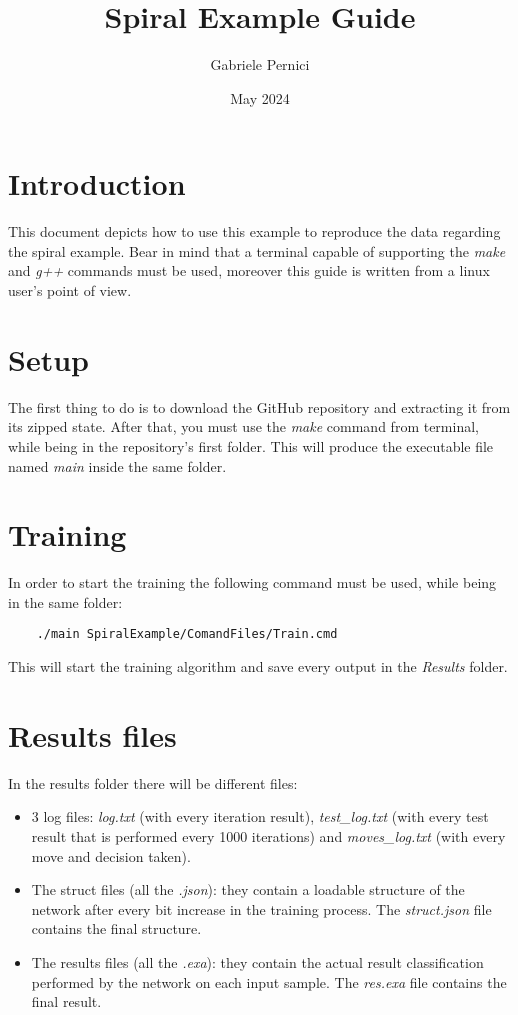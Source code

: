 \documentclass{article}
\title{Spiral Example Guide}
\author{Gabriele Pernici}
\date{May 2024}
\begin{document}
	
\maketitle

\tableofcontents

\section{Introduction}
This document depicts how to use this example to reproduce the data regarding the spiral example. Bear in mind that a terminal capable of supporting the \textit{make} and \textit{g++} commands must be used, moreover this guide is written from a linux user's point of view.


\section{Setup}
The first thing to do is to download the GitHub repository and extracting it from its zipped state. After that, you must use the \textit{make} command from terminal, while being in the repository's first folder. This will produce the executable file named \textit{main} inside the same folder.

\section{Training} \label{sec:train}
In order to start the training the following command must be used, while being in the same folder:

\begin{verbatim}
	./main SpiralExample/ComandFiles/Train.cmd
\end{verbatim}

This will start the training algorithm and save every output in the \textit{Results} folder.

\section{Results files}
In the results folder there will be different files: 
\begin{itemize}
	\item 3 log files: \textit{log.txt} (with every iteration result), \textit{test\_log.txt} (with every test result that is performed every 1000 iterations) and \textit{moves\_log.txt} (with every move and decision taken).
	
	\item The struct files (all the \textit{.json}): they contain a loadable structure of the network after every bit increase in the training process. The \textit{struct.json} file contains the final structure.
	
	\item The results files (all the \textit{.exa}): they contain the actual result classification performed by the network on each input sample. The \textit{res.exa} file contains the final result.
\end{itemize}
\end{document}
